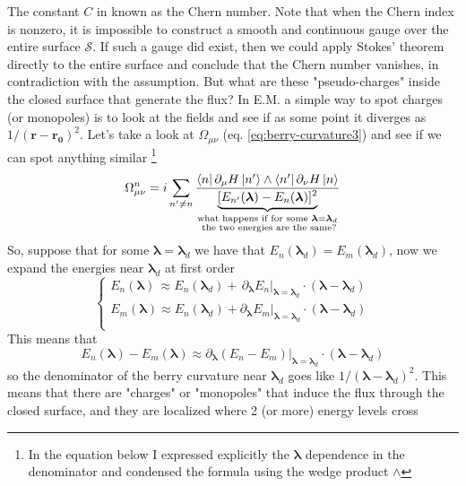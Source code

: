     The constant $C$ in known as the Chern number. Note that when the Chern index is nonzero, it is impossible to construct a smooth and continuous gauge over the entire surface $\mathcal{S}$. If such a gauge did exist, then we could apply Stokes’ theorem directly to the entire surface and conclude that the Chern number vanishes, in contradiction with the assumption.\newline
    But what are these "pseudo-charges" inside the closed surface that generate the flux?\newline
    In E.M. a simple way to spot charges (or monopoles) is to look at the fields and see if as some point it diverges as $1/(\mathbf r-\mathbf{r_0})^2$. Let's take a look at $\Omega_{\mu\nu}$ (eq. \ref{eq:berry-curvature3}) and see if we can spot anything similar \footnote{In the equation below I expressed explicitly the $\boldsymbol \lambda$ dependence in the denominator and condensed the formula using the wedge product $\wedge$}
    \begin{equation}
        \label{eq:monopoles1}
        \Omega_{\mu\nu}^n=i\sum_{n'\neq n} \frac{\bra{n}\partial_\mu H\ket{n'}\wedge \bra{n'} \partial_\nu H\ket{n}}
        {\underbrace{[E_{n'}(\boldsymbol \lambda)-E_n(\boldsymbol \lambda)]^2}_
        {\substack{\text{what happens if for some } \boldsymbol \lambda=\boldsymbol \lambda_d  \\\text{ the two energies are the same?}}}}
    \end{equation}
    So, suppose that for some $\boldsymbol \lambda=\boldsymbol \lambda_d$ we have that $E_n (\boldsymbol \lambda_d)=E_m(\boldsymbol \lambda_d)$, now we expand the energies near $\boldsymbol \lambda_d$ at first order
    \[
    \begin{cases}
    E_n(\boldsymbol \lambda)\, \approx E_n(\boldsymbol \lambda_d) +\, \partial_{\boldsymbol \lambda} E_n|_{\boldsymbol \lambda =\boldsymbol \lambda_d}\cdot (\boldsymbol \lambda-\boldsymbol \lambda_d)\\
    E_m(\boldsymbol \lambda)\approx E_n(\boldsymbol \lambda_d) + \partial_{\boldsymbol \lambda} E_m|_{\boldsymbol \lambda =\boldsymbol \lambda_d}\cdot (\boldsymbol \lambda-\boldsymbol \lambda_d)\\

    \end{cases}
    \]
    This means that 
    \[
    E_n(\boldsymbol \lambda)-E_m(\boldsymbol \lambda)\approx \partial_{\boldsymbol \lambda} (E_n-E_m)|_{\boldsymbol \lambda =\boldsymbol \lambda_d}\cdot (\boldsymbol \lambda-\boldsymbol \lambda_d)
    \]
    so the denominator of the berry curvature near $\boldsymbol \lambda_d$ goes like $ 1/(\boldsymbol \lambda-\boldsymbol \lambda_d)^2$.\newline
    This means that there are "charges" or "monopoles" that induce the flux through the closed surface, and they are localized where 2 (or more) energy levels cross

